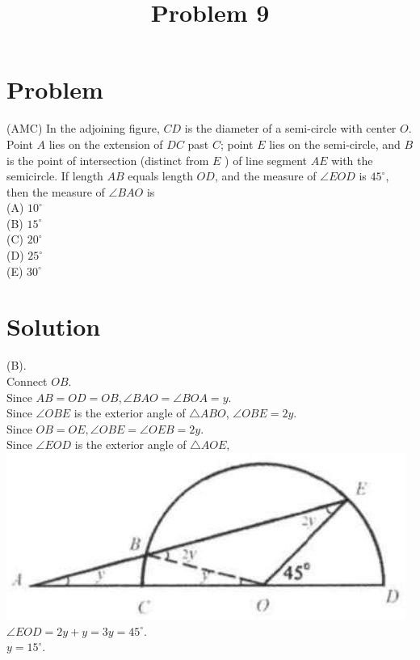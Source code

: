 \documentclass{article}
\title{Problem 9}
\date{}
\begin{document}
\maketitle

\section*{Problem}
(AMC) In the adjoining figure, \(C D\) is the diameter of a semi-circle with center \(O\). Point \(A\) lies on the extension of \(D C\) past \(C\); point \(E\) lies on the semi-circle, and \(B\) is the point of intersection (distinct from \(E\) ) of line segment \(A E\) with the semicircle. If length \(A B\) equals length \(O D\), and the measure of \(\angle E O D\) is \(45^{\circ}\), then the measure of \(\angle B A O\) is\\
(A) \(10^{\circ}\)\\
(B) \(15^{\circ}\)\\
(C) \(20^{\circ}\)\\
(D) \(25^{\circ}\)\\
(E) \(30^{\circ}\)

\section*{Solution}
(B).\\
Connect \(O B\).\\
Since \(A B=O D=O B, \angle B A O=\angle B O A=y\).\\
Since \(\angle O B E\) is the exterior angle of \(\triangle A B O\), \(\angle O B E=2 y\).\\
Since \(O B=O E, \angle O B E=\angle O E B=2 y\).\\
Since \(\angle E O D\) is the exterior angle of \(\triangle A O E\),\\
\centering
\includegraphics[width=\textwidth]{images/159(2).jpg}\\
\(\angle E O D=2 y+y=3 y=45^{\circ}\).\\
\(y=15^{\circ}\).\\
\end{document}
